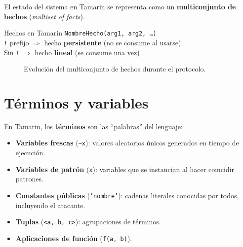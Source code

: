 \documentclass[12pt, a4paper, twoside, openright]{book}
\begin{document}
El estado del sistema en Tamarin se representa como un
\textbf{multiconjunto de hechos} (\textit{multiset of facts}).

\begin{cajaSintaxis}{Hechos en Tamarin}
  \texttt{NombreHecho(arg1, arg2, \ldots)}\\
  \texttt{!} prefijo $\Rightarrow$ hecho \textbf{persistente}
    (no se consume al usarse)\\
  Sin \texttt{!} $\Rightarrow$ hecho \textbf{lineal}
    (se consume una vez)
\end{cajaSintaxis}

\begin{figure}[H]
\centering
{}
\caption{Evoluci\'on del multiconjunto de hechos durante el protocolo.}
\label{fig:multiconjunto}
\end{figure}

\section{T\'erminos y variables}

En Tamarin, los \textbf{t\'erminos} son las ``palabras'' del lenguaje:
\begin{itemize}[leftmargin=*, itemsep=4pt]
  \item \textbf{Variables frescas} (\texttt{\textasciitilde x}):
    valores aleatorios \'unicos generados en tiempo de ejecuci\'on.
  \item \textbf{Variables de patr\'on} (\texttt{x}):
    variables que se instancian al hacer coincidir patrones.
  \item \textbf{Constantes p\'ublicas} (\texttt{'nombre'}):
    cadenas literales conocidas por todos, incluyendo el atacante.
  \item \textbf{Tuplas} (\texttt{<a, b, c>}): agrupaciones de t\'erminos.
  \item \textbf{Aplicaciones de funci\'on} (\texttt{f(a, b)}).
\end{itemize}
\end{document}
